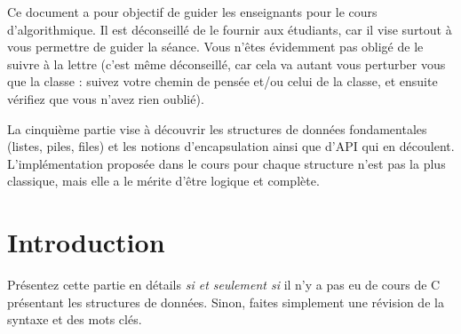 \documentclass[11pt,a4paper]{article}
\begin{document}
\EncadreTitre

\bigskip


%
%

\bigskip


Ce document a pour objectif de guider les enseignants pour le cours d'algorithmique.
Il est déconseillé de le fournir aux étudiants, car il vise surtout à vous permettre de guider la séance.
Vous n'êtes évidemment pas obligé de le suivre à la lettre (c'est même déconseillé, car cela va autant vous perturber vous que la classe : suivez votre chemin de pensée et/ou celui de la classe, et ensuite vérifiez que vous n'avez rien oublié).

\medskip

La cinquième partie vise à découvrir les structures de données fondamentales (listes, piles, files) et les notions d'encapsulation ainsi que d'API qui en découlent.
L'implémentation proposée dans le cours pour chaque structure n'est pas la plus classique, mais elle a le mérite d'être logique et complète.


\bigskip


\section{Introduction}

Présentez cette partie en détails \textit{si et seulement si} il n'y a pas eu de cours de C présentant les structures de données.
Sinon, faites simplement une révision de la syntaxe et des mots clés.

\medskip
\end{document}
